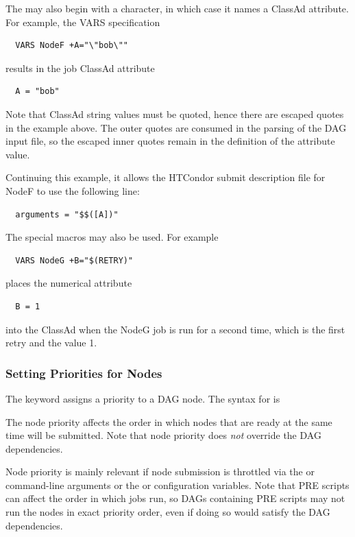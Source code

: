 The  may also begin with a \Expr{+} character, in which case it
names a ClassAd attribute. For example, the VARS specification
\begin{verbatim}
  VARS NodeF +A="\"bob\""
\end{verbatim}
results in the job ClassAd attribute
\begin{verbatim}
  A = "bob"
\end{verbatim}
Note that ClassAd string values must be quoted, hence there are escaped
quotes in the example above.  The outer quotes are consumed in the parsing of
the DAG input file, so the escaped inner quotes remain in the definition
of the attribute value.

Continuing this example,
it allows the HTCondor submit description file for NodeF to use
the following line:
\begin{verbatim}
  arguments = "$$([A])"
\end{verbatim}

The special macros may also be used.
For example
\begin{verbatim}
  VARS NodeG +B="$(RETRY)"
\end{verbatim}
places the numerical attribute
\begin{verbatim}
  B = 1
\end{verbatim}
into the ClassAd when the NodeG job is run for a second time,
which is the first retry and the value 1. 

\subsubsection{Setting Priorities for Nodes}

The  keyword assigns a priority to a DAG node.
The syntax for  is

  

The node priority affects the order in which nodes that are ready
at the same time will be submitted.  Note that node priority does
\emph{not} override the DAG dependencies.

Node priority is mainly relevant if
node submission is throttled via the  or 
command-line arguments or the  or
 configuration variables.  Note that PRE
scripts can affect the order in which jobs run, so DAGs containing
PRE scripts may not run the nodes in exact priority order, even if
doing so would satisfy the DAG dependencies.

